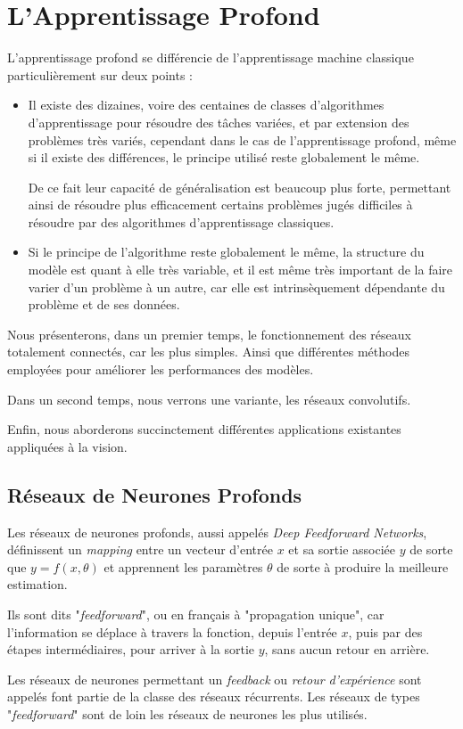 \documentclass[a4paper, 10pt]{report}
\begin{document}
\chapter{L'Apprentissage Profond}
L'apprentissage profond se différencie de l'apprentissage machine classique particulièrement sur deux points :
\begin{itemize}
	\item Il existe des dizaines, voire des centaines de classes d'algorithmes d'apprentissage pour résoudre des tâches variées, et par extension des problèmes très variés, cependant dans le cas de l'apprentissage profond, même si il existe des différences, le principe utilisé reste globalement le même.
	
	De ce fait leur capacité de généralisation est beaucoup plus forte, permettant ainsi de résoudre plus efficacement certains problèmes jugés difficiles à résoudre par des algorithmes d'apprentissage classiques.
	\item Si le principe de l'algorithme reste globalement le même, la structure du modèle est quant à elle très variable, et il est même très important de la faire varier d'un problème à un autre, car elle est intrinsèquement dépendante du problème et de ses données.
	      \end{itemize}
Nous présenterons, dans un premier temps, le fonctionnement des réseaux totalement connectés, car les plus simples. Ainsi que différentes méthodes employées pour améliorer les performances des modèles.

Dans un second temps, nous verrons une variante, les réseaux convolutifs.

Enfin, nous aborderons succinctement différentes applications existantes appliquées à la vision.
\section{Réseaux de Neurones Profonds}
Les réseaux de neurones profonds, aussi appelés \emph{Deep Feedforward Networks}, définissent un \emph{mapping} entre un vecteur d'entrée $x$ et sa sortie associée $y$ de sorte que $y = f(x,\theta)$ et apprennent les paramètres $\theta$ de sorte à produire la meilleure estimation.

Ils sont dits "\emph{feedforward}", ou en français à "propagation unique", car l'information se déplace à travers la fonction, depuis l'entrée $x$, puis par des étapes intermédiaires, pour arriver à la sortie $y$, sans aucun retour en arrière.

Les réseaux de neurones permettant un \emph{feedback} ou \emph{retour d'expérience} sont appelés font partie de la classe des réseaux récurrents.
Les réseaux de types "\emph{feedforward}" sont de loin les réseaux de neurones les plus utilisés.
\end{document}
